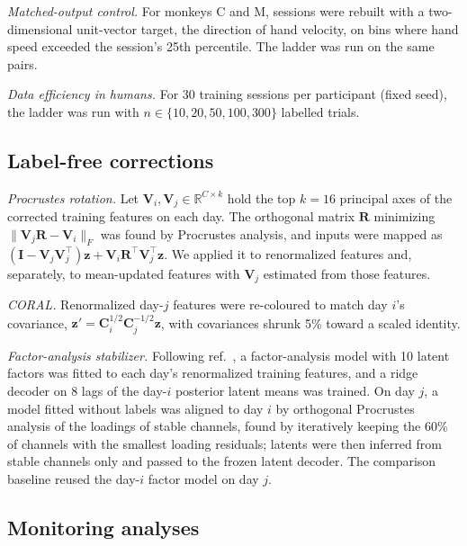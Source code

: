 \documentclass[pdflatex,sn-nature]{sn-jnl}
\begin{document}
\textit{Matched-output control.} For monkeys C and M, sessions were rebuilt with a two-dimensional unit-vector target,
the direction of hand velocity, on bins where hand speed exceeded the session's 25th percentile. The ladder was run on
the same pairs.

\textit{Data efficiency in humans.} For 30 training sessions per participant (fixed seed), the ladder was run with
$n \in \{10, 20, 50, 100, 300\}$ labelled trials.

\subsection*{Label-free corrections}

\textit{Procrustes rotation.} Let $\mathbf{V}_i, \mathbf{V}_j \in \mathbb{R}^{C\times k}$ hold the top $k = 16$ principal
axes of the corrected training features on each day. The orthogonal matrix $\mathbf{R}$ minimizing
$\|\mathbf{V}_j\mathbf{R} - \mathbf{V}_i\|_F$ was found by Procrustes analysis\cite{schonemann1966}, and inputs were mapped
as $(\mathbf{I} - \mathbf{V}_j\mathbf{V}_j^\top)\mathbf{z} + \mathbf{V}_i\mathbf{R}^\top\mathbf{V}_j^\top\mathbf{z}$. We
applied it to renormalized features and, separately, to mean-updated features with $\mathbf{V}_j$ estimated from those
features.

\textit{CORAL.} Renormalized day-$j$ features were re-coloured to match day $i$'s covariance,
$\mathbf{z}' = \mathbf{C}_i^{1/2}\mathbf{C}_j^{-1/2}\mathbf{z}$\cite{sun2016}, with covariances shrunk 5\% toward a scaled
identity.

\textit{Factor-analysis stabilizer.} Following ref.~\cite{degenhart2020}, a factor-analysis model with 10 latent factors
was fitted to each day's renormalized training features, and a ridge decoder on 8 lags of the day-$i$ posterior latent
means was trained. On day $j$, a model fitted without labels was aligned to day $i$ by orthogonal Procrustes analysis of
the loadings of stable channels, found by iteratively keeping the 60\% of channels with the smallest loading residuals;
latents were then inferred from stable channels only and passed to the frozen latent decoder. The comparison baseline
reused the day-$i$ factor model on day $j$.

\subsection*{Monitoring analyses}
\end{document}
